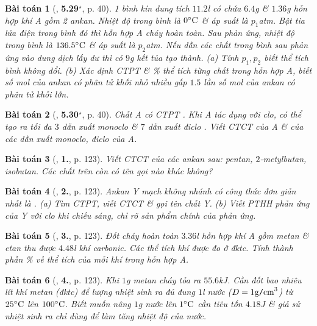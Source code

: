 \documentclass{article}
\numberwithin{equation}{section}
\newtheorem{baitoan}{Bài toán}[section]
\begin{document}
\begin{baitoan}[\cite{SBT_Hoa_Hoc_11_co_ban}, \textbf{5.29}${}^\star$, p. 40]
	1 bình kín dung tích $11.2$\emph{l} có chứa $6.4$\emph{g} \emph{} \& $1.36$\emph{g} hỗn hợp khí A gồm 2 ankan. Nhiệt độ trong bình là $0^\circ{\rm C}$ \& áp suất là $p_1$\emph{atm}. Bật tia lửa điện trong bình đó thì hỗn hợp A cháy hoàn toàn. Sau phản ứng, nhiệt độ trong bình là $136.5^\circ{\rm C}$ \& áp suất là $p_2$\emph{atm}. Nếu dẫn các chất trong bình sau phản ứng vào dung dịch \emph{} lấy dư thì có $9$\emph{g} kết tủa tạo thành. (a) Tính $p_1,p_2$ biết thể tích bình không đổi. (b) Xác định CTPT \& \% thể tích từng chất trong hỗn hợp A, biết số mol của ankan có phân tử khối nhỏ nhiều gấp $1.5$ lần số mol của ankan có phân tử khối lớn.
\end{baitoan}

\begin{baitoan}[\cite{SBT_Hoa_Hoc_11_co_ban}, \textbf{5.30}${}^\star$, p. 40]
	Chất A có CTPT \emph{}. Khi A tác dụng với clo, có thể tạo ra tối đa $3$ dẫn xuất monoclo \emph{} \& $7$ dẫn xuất điclo \emph{}. Viết CTCT của A \& của các dẫn xuất monoclo, điclo của A.
\end{baitoan}

\begin{baitoan}[\cite{SGK_Hoa_Hoc_11_co_ban}, \textbf{1.}, p. 123]
	Viết CTCT của các ankan sau: pentan, $2$-metylbutan, isobutan. Các chất trên còn có tên gọi nào khác không?
\end{baitoan}

\begin{baitoan}[\cite{SGK_Hoa_Hoc_11_co_ban}, \textbf{2.}, p. 123]
	Ankan Y mạch không nhánh có công thức đơn giản nhất là \emph{}. (a) Tìm CTPT, viết CTCT \& gọi tên chất Y. (b) Viết PTHH phản ứng của Y với clo khi chiếu sáng, chỉ rõ sản phẩm chính của phản ứng.
\end{baitoan}

\begin{baitoan}[\cite{SGK_Hoa_Hoc_11_co_ban}, \textbf{3.}, p. 123]
	Đốt cháy hoàn toàn $3.36$\emph{l} hỗn hợp khí A gồm metan \& etan thu được $4.48$\emph{l} khí carbonic. Các thể tích khí được đo ở đktc. Tính thành phần \% về thể tích của mỗi khí trong hỗn hợp A.
\end{baitoan}

\begin{baitoan}[\cite{SGK_Hoa_Hoc_11_co_ban}, \textbf{4.}, p. 123]
	Khi $1$\emph{g} metan cháy tỏa ra $55.6$\emph{kJ}. Cần đốt bao nhiêu lít khí metan (đktc) để lượng nhiệt sinh ra đủ đung $1$\emph{l} nước ($D = 1{\rm g\texttt{/}cm}^3$) từ $25^\circ{\rm C}$ lên $100^\circ{\rm C}$. Biết muốn nâng $1$\emph{g} nước lên $1^\circ{\rm C}$ cần tiêu tốn $4.18$\emph{J} \& giả sử nhiệt sinh ra chỉ dùng để làm tăng nhiệt độ của nước.
\end{baitoan}
\end{document}
